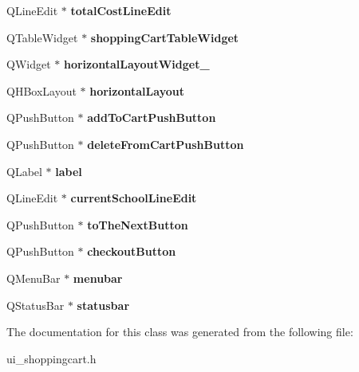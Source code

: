 \begin{DoxyCompactItemize}
Q\+Line\+Edit $\ast$ {\bfseries total\+Cost\+Line\+Edit}
\item 
\mbox{\label{class_ui__shoppingcart_a9b680a5cd01f11d2fd02286da713ab3c}} 
Q\+Table\+Widget $\ast$ {\bfseries shopping\+Cart\+Table\+Widget}
\item 
\mbox{\label{class_ui__shoppingcart_a8294d08df97a3a45cbe26047eebecf17}} 
Q\+Widget $\ast$ {\bfseries horizontal\+Layout\+Widget\+\_}
\item 
\mbox{\label{class_ui__shoppingcart_a96c484469dc7a6ea75435b39cdd2ed5c}} 
Q\+H\+Box\+Layout $\ast$ {\bfseries horizontal\+Layout}
\item 
\mbox{\label{class_ui__shoppingcart_ab42e9a83de8bca4601ba2aedd14e899a}} 
Q\+Push\+Button $\ast$ {\bfseries add\+To\+Cart\+Push\+Button}
\item 
\mbox{\label{class_ui__shoppingcart_a61bd21d313b8772418034c52df8b3c09}} 
Q\+Push\+Button $\ast$ {\bfseries delete\+From\+Cart\+Push\+Button}
\item 
\mbox{\label{class_ui__shoppingcart_a0f3a724477b86b0ef7973d57549da404}} 
Q\+Label $\ast$ {\bfseries label}
\item 
\mbox{\label{class_ui__shoppingcart_a069dc89cbff6a0b05a676a13500993fc}} 
Q\+Line\+Edit $\ast$ {\bfseries current\+School\+Line\+Edit}
\item 
\mbox{\label{class_ui__shoppingcart_a424ca814e0fd955e0e29f6af769ef0de}} 
Q\+Push\+Button $\ast$ {\bfseries to\+The\+Next\+Button}
\item 
\mbox{\label{class_ui__shoppingcart_a5370dae8f06571e0c6d7fc376f79ed1c}} 
Q\+Push\+Button $\ast$ {\bfseries checkout\+Button}
\item 
\mbox{\label{class_ui__shoppingcart_a4440f234af4f1c16c6c8a77ca4ddc570}} 
Q\+Menu\+Bar $\ast$ {\bfseries menubar}
\item 
\mbox{\label{class_ui__shoppingcart_aa3065de93546dff35bf3a60d4a1c836d}} 
Q\+Status\+Bar $\ast$ {\bfseries statusbar}
\end{DoxyCompactItemize}


The documentation for this class was generated from the following file\+:\begin{DoxyCompactItemize}
\item 
ui\+\_\+shoppingcart.\+h\end{DoxyCompactItemize}
